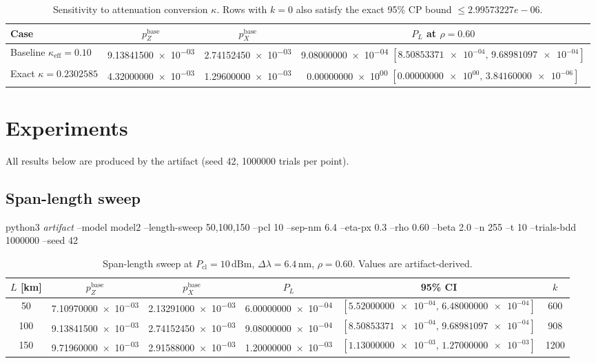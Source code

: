 \documentclass{article}
\newcommand{\nexact}[1]{#1}
\newcommand{\cmd}[1]{\par\noindent\begingroup\scriptsize\ttfamily\raggedright\sloppy #1\par\endgroup}
\newcommand{\simL}{100}
\newcommand{\simpcl}{10}
\newcommand{\simsep}{6.4}
\newcommand{\simeta}{0.3}
\newcommand{\simn}{255}
\newcommand{\simt}{10}
\newcommand{\simtrials}{1000000}
\newcommand{\simseed}{42}
\newcommand{\simpz}{9.13841500e-03}
\newcommand{\simpx}{2.74152450e-03}
\newcommand{\simrhoB}{0.60}
\newcommand{\simpLB}{9.08000000e-04}
\newcommand{\simpLBlo}{8.50853371e-04}
\newcommand{\simpLBhi}{9.68981097e-04}
\newcommand{\simkB}{908}
\newcommand{\simkappaExact}{0.2302585}
\newcommand{\simpzExact}{4.32000000e-03}
\newcommand{\simpxExact}{1.29600000e-03}
\newcommand{\simpLExact}{0.00000000e+00}
\newcommand{\simpLExactlo}{0.00000000e+00}
\newcommand{\simpLExacthi}{3.84160000e-06}
\newcommand{\simCPUpperZero}{2.99573227e-06}
\newcommand{\simLfa}{50}
\newcommand{\simpzLfa}{7.10970000e-03}
\newcommand{\simpxLfa}{2.13291000e-03}
\newcommand{\simpLLfa}{6.00000000e-04}
\newcommand{\simpLLfalo}{5.52000000e-04}
\newcommand{\simpLLfahi}{6.48000000e-04}
\newcommand{\simkLfa}{600}
\newcommand{\simLfb}{150}
\newcommand{\simpzLfb}{9.71960000e-03}
\newcommand{\simpxLfb}{2.91588000e-03}
\newcommand{\simpLLfb}{1.20000000e-03}
\newcommand{\simpLLfblo}{1.13000000e-03}
\newcommand{\simpLLfbhi}{1.27000000e-03}
\newcommand{\simkLfb}{1200}
\begin{document}
\begin{table}[ht]
\small
\centering
\caption{Sensitivity to attenuation conversion \(\kappa\). Rows with \(k=0\) also satisfy the exact 95\% CP bound \(\le\nexact{\simCPUpperZero}\).}
\label{tab:kappa}
\begin{adjustbox}{width=\linewidth}
\begin{tabular}{lccc}
\toprule
Case & \(p_Z^{\text{base}}\) & \(p_X^{\text{base}}\) & \(P_L\) at \(\rho=\simrhoB\) \\
\midrule
Baseline \(\kappa_{\mathrm{eff}}=0.10\) & \num{\simpz} & \num{\simpx} & \num{\simpLB} \([\num{\simpLBlo},\,\num{\simpLBhi}]\) \\
Exact \(\kappa=\nexact{\simkappaExact}\) & \num{\simpzExact} & \num{\simpxExact} & \num{\simpLExact} \([\num{\simpLExactlo},\,\num{\simpLExacthi}]\) \\
\bottomrule
\end{tabular}
\end{adjustbox}

\end{table}

\section{Experiments}\label{sec:experiments}
All results below are produced by the artifact (seed \simseed, \simtrials{} trials per point).

\subsection{Span-length sweep}
\cmd{python3 \emph{artifact} --model model2 --length-sweep \simLfa{},\simL{},\simLfb{} --pcl \simpcl{} --sep-nm \simsep{} --eta-px \simeta{} --rho \simrhoB{} --beta 2.0 --n \simn{} --t \simt{} --trials-bdd \simtrials{} --seed \simseed}

\begin{table}[ht]
\small
\centering
\caption{Span-length sweep at \(P_{\mathrm{cl}}=\simpcl\,\mathrm{dBm}\), \(\Delta\lambda=\simsep\,\mathrm{nm}\), \(\rho=\simrhoB\). Values are artifact-derived.}
\label{tab:length}
\begin{adjustbox}{width=\linewidth}
\begin{tabular}{cccccc}
\toprule
\(L\) [km] & \(p_Z^{\text{base}}\) & \(p_X^{\text{base}}\) & \(P_L\) & 95\% CI & \(k\) \\
\midrule
\simLfa & \num{\simpzLfa} & \num{\simpxLfa} & \num{\simpLLfa} & \([\num{\simpLLfalo},\,\num{\simpLLfahi}]\) & \simkLfa \\
\simL & \num{\simpz} & \num{\simpx} & \num{\simpLB} & \([\num{\simpLBlo},\,\num{\simpLBhi}]\) & \simkB \\
\simLfb & \num{\simpzLfb} & \num{\simpxLfb} & \num{\simpLLfb} & \([\num{\simpLLfblo},\,\num{\simpLLfbhi}]\) & \simkLfb \\
\bottomrule
\end{tabular}
\end{adjustbox}

\end{table}
\end{document}
